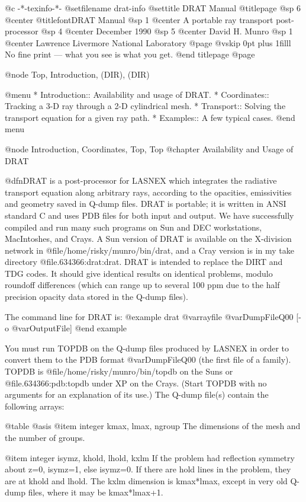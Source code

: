   @c -*-texinfo-*-
@setfilename drat-info
@settitle DRAT Manual
@titlepage
@sp 6
@center @titlefont{DRAT Manual}
@sp 1
@center A portable ray transport post-processor
@sp 4
@center December 1990
@sp 5
@center David H. Munro
@sp 1
@center Lawrence Livermore National Laboratory
@page
@vskip 0pt plus 1filll
No fine print --- what you see is what you get.
@end titlepage
@page

@node Top, Introduction, (DIR), (DIR)

@menu
* Introduction:: Availability and usage of DRAT.
* Coordinates::  Tracking a 3-D ray through a 2-D cylindrical mesh.
* Transport::    Solving the transport equation for a given ray path.
* Examples::     A few typical cases.
@end menu

@node Introduction, Coordinates, Top, Top
@chapter Availability and Usage of DRAT

@dfn{DRAT} is a post-processor for LASNEX which integrates the radiative
transport equation along arbitrary rays, according to the opacities,
emissivities and geometry saved in Q-dump files.  DRAT is portable; it
is written in ANSI standard C and uses PDB files for both input and
output.  We have successfully compiled and run many such programs on Sun
and DEC workstations, MacIntoshes, and Crays.  A Sun version of DRAT is
available on the X-division network in @file{/home/risky/munro/bin/drat},
and a Cray version is in my take directory @file{.634366:drat:drat}.
DRAT is intended to replace the DIRT and TDG codes.  It should give
identical results on identical problems, modulo roundoff differences
(which can range up to several 100 ppm due to the half precision opacity
data stored in the Q-dump files).

The command line for DRAT is:
@example
drat @var{rayfile} @var{DumpFileQ00} [-o @var{OutputFile}]
@end example

You must run TOPDB on the Q-dump files produced by LASNEX in order to
convert them to the PDB format @var{DumpFileQ00} (the first file of a
family).  TOPDB is @file{/home/risky/munro/bin/topdb} on the Suns or
@file{.634366:pdb:topdb} under XP on the Crays.  (Start TOPDB with no
arguments for an explanation of its use.)  The Q-dump file(s) contain
the following arrays:

@table @asis
@item integer kmax, lmax, ngroup
The dimensions of the mesh and the number of groups.

@item integer isymz, khold, lhold, kxlm
If the problem had reflection symmetry about z=0, isymz=1,
else isymz=0.  If there are hold lines in the problem, they
are at khold and lhold.  The kxlm dimension is kmax*lmax,
except in very old Q-dump files, where it may be kmax*lmax+1.

